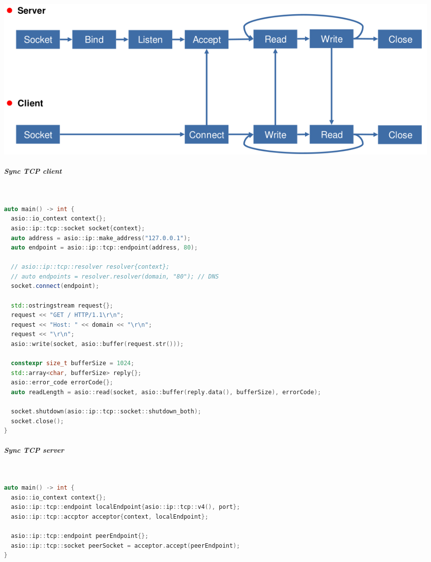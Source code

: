 \documentclass[11pt,twoside,landscape]{article}
\begin{document}
\begin{multicols}{2}
{
\begin{center}
\includegraphics[width=.9\linewidth]{img/connection_oriented_communication_pattern.png}
\end{center}
\label{tbl:connection-oriented-communication-pattern-using-sockets}
}
\subparagraph{Sync TCP client} \
\label{sec:orgb62898a}
\begin{lstlisting}[language=c++,label=lst:client-connection-example-using-asio,caption={Client connection example using ASIO},captionpos=b,numbers=none]
auto main() -> int {
  asio::io_context context{};
  asio::ip::tcp::socket socket{context};
  auto address = asio::ip::make_address("127.0.0.1");
  auto endpoint = asio::ip::tcp::endpoint(address, 80);

  // asio::ip::tcp::resolver resolver{context};
  // auto endpoints = resolver.resolver(domain, "80"); // DNS
  socket.connect(endpoint);

  std::ostringstream request{};
  request << "GET / HTTP/1.1\r\n";
  request << "Host: " << domain << "\r\n";
  request << "\r\n";
  asio::write(socket, asio::buffer(request.str()));

  constexpr size_t bufferSize = 1024;
  std::array<char, bufferSize> reply{};
  asio::error_code errorCode{};
  auto readLength = asio::read(socket, asio::buffer(reply.data(), bufferSize), errorCode);

  socket.shutdown(asio::ip::tcp::socket::shutdown_both);
  socket.close();
}
\end{lstlisting}

\subparagraph{Sync TCP server} \
\label{sec:orge253477}
\begin{lstlisting}[language=c++,label=lst:server-example-using-asio,caption={Server example using ASIO},captionpos=b,numbers=none]
auto main() -> int {
  asio::io_context context{};
  asio::ip::tcp::endpoint localEndpoint{asio::ip::tcp::v4(), port};
  asio::ip::tcp::accptor acceptor{context, localEndpoint};

  asio::ip::tcp::endpoint peerEndpoint{};
  asio::ip::tcp::socket peerSocket = acceptor.accept(peerEndpoint);
}
\end{lstlisting}


\end{multicols}
\end{document}

